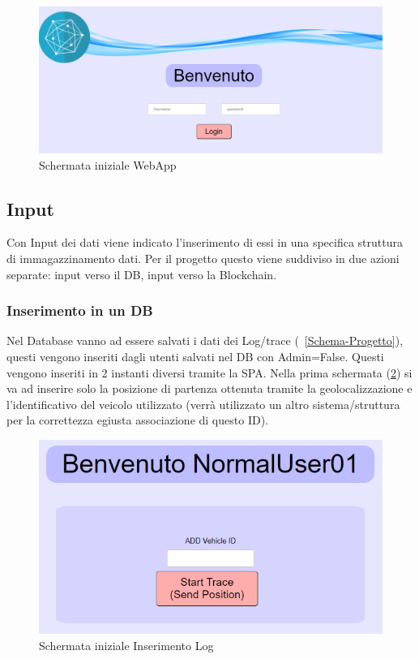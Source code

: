 \documentclass[11pt,a4paper,titlepage,twoside,openright]{report}
\begin{document}
\begin{figure}[h]
	\includegraphics[width=\textwidth]{HomePage}
	\centering
	\caption{Schermata iniziale WebApp}
	\label{fig:HomePage}
\end{figure}

\subsection{Input}
Con Input dei dati viene indicato l'inserimento di essi in una specifica struttura di immagazzinamento dati. Per il progetto questo viene suddiviso in due azioni separate: input verso il DB, input verso la Blockchain.
\subsubsection{Inserimento in un DB}
Nel Database vanno ad essere salvati i dati dei Log/trace (~\ref{Schema-Progetto}), questi vengono inseriti dagli utenti salvati nel DB con Admin=False. Questi vengono inseriti in 2 instanti diversi tramite la SPA.
Nella prima schermata (\ref{fig:Init_Log}) si va ad inserire solo la posizione di partenza ottenuta tramite la geolocalizzazione e l'identificativo del veicolo utilizzato (verrà utilizzato un altro sistema/struttura per la correttezza egiusta associazione di questo ID).

\begin{figure}[h]
	\includegraphics[width=\textwidth]{Init_Log}
	\centering
	\caption{Schermata iniziale Inserimento Log}
	\label{fig:Init_Log}
\end{figure}
\end{document}
